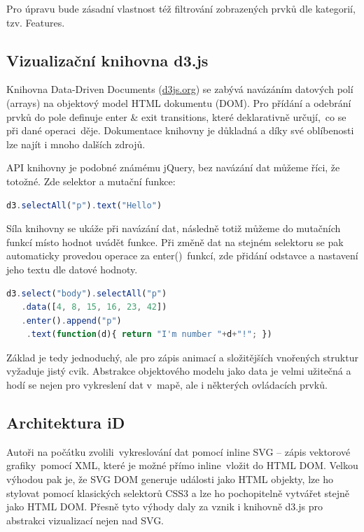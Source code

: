 Pro úpravu bude zásadní vlastnost též filtrování zobrazených prvků dle kategorií, tzv. Features.

\subsection{Vizualizační knihovna d3.js}\label{vizualizaux10dnuxed-knihovna-d3.js}

Knihovna Data-Driven Documents (\href{http://d3js.org}{d3js.org}) se zabývá navázáním datových polí (arrays) na objektový model HTML dokumentu (DOM). Pro přídání a odebrání prvků do pole definuje enter \& exit transitions, které deklarativně určují,~co se při dané operaci~děje. Dokumentace knihovny je důkladná a díky své oblíbenosti lze najít i mnoho dalších zdrojů.

API knihovny je podobné známému jQuery, bez navázání dat můžeme říci, že totožné. Zde selektor a mutační funkce:

\begin{lstlisting}[language=javascript]
d3.selectAll("p").text("Hello")
\end{lstlisting}

Síla knihovny se ukáže při navázání dat, následně totiž můžeme do mutačních funkcí místo hodnot uvádět funkce. Při změně dat na stejném selektoru se pak automaticky provedou operace za enter()~funkcí, zde přidání odstavce a nastavení jeho textu dle datové hodnoty.

\begin{lstlisting}[language=javascript]
d3.select("body").selectAll("p")
   .data([4, 8, 15, 16, 23, 42])
   .enter().append("p")
    .text(function(d){ return "I'm number "+d+"!"; })
\end{lstlisting}


Základ je tedy jednoduchý, ale pro zápis animací a složitějších vnořených struktur vyžaduje jistý cvik. Abstrakce objektového modelu jako data je velmi užitečná a hodí se nejen pro vykreslení dat v~mapě, ale i některých ovládacích prvků.

\subsection{Architektura iD}\label{architektura-id}

Autoři na počátku zvolili\cite{zdroj53}~vykreslování dat pomocí inline SVG -- zápis vektorové grafiky~pomocí XML, které je možné přímo inline~vložit do HTML DOM. Velkou výhodou pak je, že SVG DOM generuje události jako HTML objekty, lze ho stylovat pomocí klasických selektorů CSS3 a lze ho pochopitelně vytvářet stejně jako HTML DOM. Přesně tyto výhody daly za vznik i knihovně d3.js pro abstrakci vizualizací nejen nad SVG.

